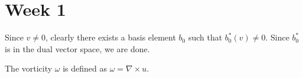 \section*{Week 1}

Since $v \neq 0$, clearly there exists a basis element $b_0$ such that $b_0^{\ast}(v) \neq 0$. Since $b_0^{\ast}$ is in the dual vector space, we are done.

 The vorticity $ω$ is defined as $ω = ∇ × u$.